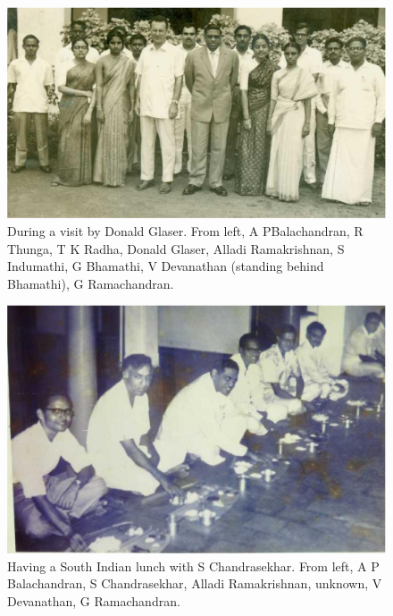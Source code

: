 \begin{figure}[H]
\centering
\includegraphics[scale=0.34]{src/images/chap25/4.eps}
\caption{During a visit by Donald Glaser. From left, A P\break Balachandran, R Thunga,
T K Radha, Donald Glaser, Alladi Ramakrishnan, S Indumathi, G Bhamathi, 
V Devanathan (standing behind Bhamathi), G Ramachandran.}
\end{figure}
\medskip

\begin{figure}[H]
\centering
\includegraphics[scale=0.34]{src/images/chap25/5.eps}
\caption{Having a South Indian lunch with S Chandrasekhar. From left, A P
Balachandran, S Chandrasekhar, Alladi Ramakrishnan, unknown, V Devanathan, G
Ramachandran.}
\end{figure}

